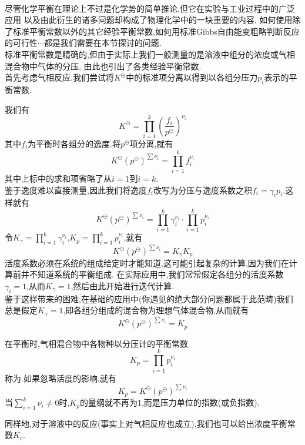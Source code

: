\documentclass{ctexart}
\begin{document}
\pagestyle{plain}
\noindent{}\vspace{15pt}\\
\indent 尽管化学平衡在理论上不过是化学势的简单推论,但它在实验与工业过程中的广泛应用%
以及由此衍生的诸多问题却构成了物理化学中的一块重要的内容.%
如何使用除了标准平衡常数以外的其它经验平衡常数,如何用标准Gibbs自由能变粗略判断反应的可行性$\cdots$都是我们需要在本节探讨的问题.\vspace{12pt}\\
\indent 标准平衡常数是精确的,但由于实际上我们一般测量的是溶液中组分的浓度或气相混合物中气体的分压,%
由此也引出了各类经验平衡常数.\\
\indent 首先考虑气相反应.我们尝试将$K^\ominus$中的标准项分离以得到以各组分压力$p_i$表示的平衡常数.
\begin{derivation}
    我们有
    \[K^\ominus = \prod_{i=1}^k \left(\dfrac{f_i}{p^\ominus}\right)^{\nu_i}\]
    其中$f_i$为平衡时各组分的逸度.将$p^\ominus$项分离,就有
    \[K^\ominus\left(p^\ominus\right)^{\sum\nu_i}=\prod_{i=1}^{k}f_i^{\nu_i}\]
    其中上标中的求和项省略了从$i=1$到$i=k$.\\
    鉴于逸度难以直接测量,因此我们将逸度$f_i$改写为分压与逸度系数之积$f_i=\gamma_ip_i$.这样就有
    \[K^\ominus\left(p^\ominus\right)^{\sum\nu_i}=\prod_{i=1}^{k}\gamma_i^{\nu_i}\cdot\prod_{i=1}^{k}p_i^{\nu_i}\]
    令$K_\gamma=\displaystyle\prod_{i=1}^{k}\gamma_i^{\nu_i}$,$K_p=\displaystyle\prod_{i=1}^{k}p_i^{\nu_i}$,就有
    \[K^\ominus\left(p^\ominus\right)^{\sum\nu_i}=K_\gamma K_p\]
    活度系数必须在系统的组成给定时才能知道,这可能引起复杂的计算,因为我们在计算前并不知道系统的平衡组成.%
    在实际应用中,我们常常假定各组分的活度系数$\gamma_i=1$,从而$K_\gamma=1$,然后由此开始进行迭代计算.\\
    鉴于这样带来的困难,在基础的应用中(你遇见的绝大部分问题都属于此范畴)我们总是假定$K_\gamma=1$,即各组分组成的混合物为理想气体混合物,从而就有
    \[K^\ominus\left(p^\ominus\right)^{\sum\nu_i}=K_p\]

\end{derivation}
\begin{definition}[5C.1.1 压力平衡常数$K_p$]
    在平衡时,气相混合物中各物种以分压计的平衡常数
    \[K_p=\prod_{i=1}^{k}p_i^{\nu_i}\]
    称为.如果忽略活度的影响,就有
    \[K_p=K^\ominus\left(p^\ominus\right)^{\sum\nu_i}\]
    当$\displaystyle\sum_{i=1}^{k}\nu_i\neq0$时,$K_p$的量纲就不再为$1$,而是压力单位的指数(或负指数).
\end{definition}
同样地,对于溶液中的反应(事实上对气相反应也成立),我们也可以给出浓度平衡常数$K_c$.
\end{document}
